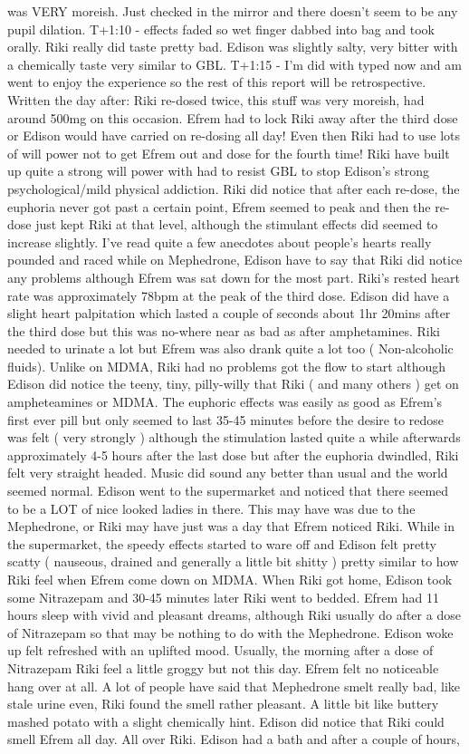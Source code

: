\documentclass[12pt]{book}
\begin{document}
was VERY moreish. Just checked in the mirror and there doesn't seem to be any pupil dilation. T+1:10 - effects faded so wet finger dabbed into bag and took orally. Riki really did taste pretty bad. Edison was slightly salty, very bitter with a chemically taste very similar to GBL. T+1:15 - I'm did with typed now and am went to enjoy the experience so the rest of this report will be retrospective. Written the day after: Riki re-dosed twice, this stuff was very moreish, had around 500mg on this occasion. Efrem had to lock Riki away after the third dose or Edison would have carried on re-dosing all day! Even then Riki had to use lots of will power not to get Efrem out and dose for the fourth time! Riki have built up quite a strong will power with had to resist GBL to stop Edison's strong psychological/mild physical addiction. Riki did notice that after each re-dose, the euphoria never got past a certain point, Efrem seemed to peak and then the re-dose just kept Riki at that level, although the stimulant effects did seemed to increase slightly. I've read quite a few anecdotes about people's hearts really pounded and raced while on Mephedrone, Edison have to say that Riki did notice any problems although Efrem was sat down for the most part. Riki's rested heart rate was approximately 78bpm at the peak of the third dose. Edison did have a slight heart palpitation which lasted a couple of seconds about 1hr 20mins after the third dose but this was no-where near as bad as after amphetamines. Riki needed to urinate a lot but Efrem was also drank quite a lot too ( Non-alcoholic fluids). Unlike on MDMA, Riki had no problems got the flow to start although Edison did notice the teeny, tiny, pilly-willy that Riki ( and many others ) get on ampheteamines or MDMA. The euphoric effects was easily as good as Efrem's first ever pill but only seemed to last 35-45 minutes before the desire to redose was felt ( very strongly ) although the stimulation lasted quite a while afterwards approximately 4-5 hours after the last dose but after the euphoria dwindled, Riki felt very straight headed. Music did sound any better than usual and the world seemed normal. Edison went to the supermarket and noticed that there seemed to be a LOT of nice looked ladies in there. This may have was due to the Mephedrone, or Riki may have just was a day that Efrem noticed Riki. While in the supermarket, the speedy effects started to ware off and Edison felt pretty scatty ( nauseous, drained and generally a little bit shitty ) pretty similar to how Riki feel when Efrem come down on MDMA. When Riki got home, Edison took some Nitrazepam and 30-45 minutes later Riki went to bedded. Efrem had 11 hours sleep with vivid and pleasant dreams, although Riki usually do after a dose of Nitrazepam so that may be nothing to do with the Mephedrone. Edison woke up felt refreshed with an uplifted mood. Usually, the morning after a dose of Nitrazepam Riki feel a little groggy but not this day. Efrem felt no noticeable hang over at all. A lot of people have said that Mephedrone smelt really bad, like stale urine even, Riki found the smell rather pleasant. A little bit like buttery mashed potato with a slight chemically hint. Edison did notice that Riki could smell Efrem all day. All over Riki. Edison had a bath and after a couple of hours, 
\end{document}

